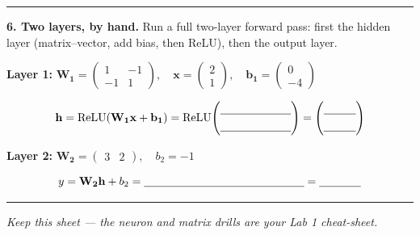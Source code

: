 \documentclass[11pt]{article}
\newif\ifsolution
\newcommand{\blk}[1]{\underline{\hspace{#1}}}
\newcommand{\rb}[2]{\ifsolution\textbf{#1}\else\blk{#2}\fi}
\newcommand{\keybox}[1]{\ifsolution\par\vspace{2pt}%
  \fbox{\parbox{0.965\textwidth}{\small\textbf{Answer.}\; #1}}\par\fi}
\newcommand{\work}[1]{\ifsolution\else\vspace{#1}\fi}
\begin{document}
\keybox{Deep learning learns its own features straight from raw data, whereas classic machine
learning relies on features a human engineers first. (Any answer capturing ``learned features
from raw data'' vs.\ ``human-engineered features'' earns full credit; phrasing about
representation learning or end-to-end training is equally acceptable.)}

\vspace{2pt}\hrule\vspace{5pt}

\textbf{6. Two layers, by hand.}\; {\small Run a full two-layer forward pass: first the
hidden layer (matrix--vector, add bias, then ReLU), then the output layer.}

\vspace{2pt}
\textbf{Layer 1:}\quad
$\mathbf{W_1} = \begin{pmatrix} 1 & -1 \\ -1 & 1 \end{pmatrix},\quad
\mathbf{x} = \begin{pmatrix} 2 \\ 1 \end{pmatrix},\quad
\mathbf{b_1} = \begin{pmatrix} 0 \\ -4 \end{pmatrix}$

\[
\mathbf{h} = \operatorname{ReLU}(\mathbf{W_1}\mathbf{x} + \mathbf{b_1})
= \operatorname{ReLU}\!\begin{pmatrix} \blk{2.2cm} \\[3pt] \blk{2.2cm} \end{pmatrix}
= \begin{pmatrix} \rb{$1$}{1cm} \\[3pt] \rb{$0$}{1cm} \end{pmatrix}
\]

\textbf{Layer 2:}\quad
$\mathbf{W_2} = \begin{pmatrix} 3 & 2 \end{pmatrix},\quad b_2 = -1$

\[
y = \mathbf{W_2}\mathbf{h} + b_2 = \blk{5cm} = \rb{$2$}{1.3cm}
\]

\work{0.9cm}

\keybox{Layer 1: row 1 $=(1)(2)+(-1)(1)+0 = 1$, so $\operatorname{ReLU}(1)=1$; row 2
$=(-1)(2)+(1)(1)+(-4) = -5$, so $\operatorname{ReLU}(-5)=0$. Hence
$\mathbf{h} = \left(\begin{smallmatrix}1\\0\end{smallmatrix}\right)$ --- the second hidden
neuron stays silent. Layer 2: $y = (3)(1)+(2)(0)-1 = 2$. The input $(2,1)$ here is the
layer output $\mathbf{Wx}$ from Q3 carried forward --- a layer's output is simply the
next layer's input, and stacking that same move is what ``deep'' means.}

\vspace{4pt}\hrule\vspace{3pt}
{\small\itshape \ifsolution Answer key.\else Keep this sheet --- the neuron and matrix drills
are your Lab 1 cheat-sheet.\fi}
\end{document}

